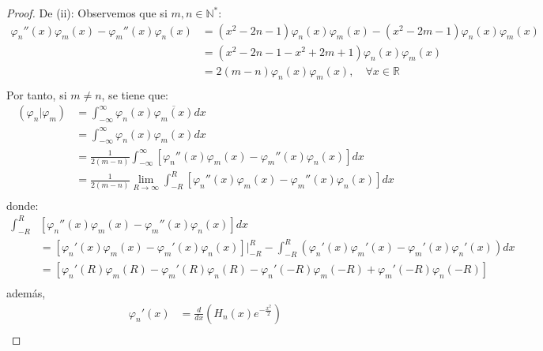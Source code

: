 \documentclass[12pt]{report}
\newcounter{it}
\theoremstyle{largebreak}
\newcommand\pint[2]{\ensuremath{\left(#1\big|#2\right)}}
\newcommand\conj[1]{\ensuremath{\overline{#1}}}
\begin{document}
\begin{proof}
        De (ii): Observemos que si $m,n\in\mathbb{N}^*$:
        \begin{equation*}
            \begin{split}
                \varphi_n''(x)\varphi_m(x)-\varphi_m''(x)\varphi_n(x)&=(x^2-2n-1)\varphi_n(x)\varphi_m(x)-(x^2-2m-1)\varphi_n(x)\varphi_m(x) \\
                &=(x^2-2n-1-x^2+2m+1)\varphi_n(x)\varphi_m(x) \\ 
                &=2(m-n)\varphi_n(x)\varphi_m(x),\quad\forall x\in\mathbb{R} \\ 
            \end{split}
        \end{equation*}
        Por tanto, si $m\neq n$, se tiene que:
        \begin{equation*}
            \begin{split}
                \pint{\varphi_n}{\varphi_m}&=\int_{-\infty}^\infty \varphi_n(x)\conj{\varphi_m(x)}dx\\
                &=\int_{-\infty}^\infty\varphi_n(x)\varphi_m(x)dx\\
                &=\frac{1}{2(m-n)} \int_{-\infty}^\infty\left[\varphi_n''(x)\varphi_m(x)-\varphi_m''(x)\varphi_n(x)\right]dx\\
                &=\frac{1}{2(m-n)} \lim_{R\rightarrow\infty} \int_{-R}^R\left[\varphi_n''(x)\varphi_m(x)-\varphi_m''(x)\varphi_n(x)\right]dx\\
            \end{split}
        \end{equation*}
        donde:
        \begin{equation*}
            \begin{split}
                \int_{-R}^R&\left[\varphi_n''(x)\varphi_m(x)-\varphi_m''(x) \varphi_n(x)\right]dx\\
                &=\left[\varphi_n'(x)\varphi_m(x)-\varphi_m'(x)\varphi_n(x)\right]\Big|_{-R}^{R}-\int_{-R}^R(\varphi_n'(x)\varphi_m'(x)-\varphi_m'(x)\varphi_n'(x))dx\\
                &=\left[\varphi_n'(R)\varphi_m(R)-\varphi_m'(R)\varphi_n(R)-\varphi_n'(-R)\varphi_m(-R)+\varphi_m'(-R)\varphi_n(-R)\right] \\
            \end{split}
        \end{equation*}
        además,
        \begin{equation*}
            \begin{split}
                \varphi_n'(x)&=\frac{d}{dx}\left(H_n(x)e^{-\frac{x^2}{2}} \right)\\

\end{split}
\end{equation*}
\end{proof}
\end{document}
